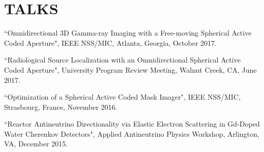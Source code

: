 \section{\small{TALKS}}

 \begin{thebibliography}{3}
 \raggedright
 \vspace{10pt}

 ``Omnidirectional 3D Gamma-ray Imaging with a Free-moving Spherical Active Coded Aperture", IEEE NSS/MIC, Atlanta, Georgia, October 2017.
 
  ``Radiological Source Localization with an Omnidirectional Spherical Active Coded Aperture", University Program Review Meeting, Walnut Creek, CA, June 2017.
 
  ``Optimization of a Spherical Active Coded Mask Imager", IEEE NSS/MIC, Strasbourg, France, November 2016.

 ``Reactor Antineutrino Directionality via Elastic Electron Scattering in Gd-Doped Water Cherenkov Detectors", Applied Antineutrino Physics Workshop, Arlington, VA, December 2015.

 \end{thebibliography}